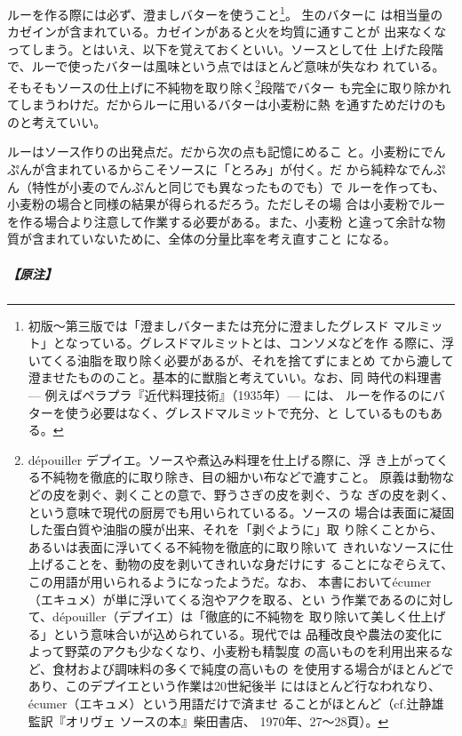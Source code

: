 \begin{recette}
ルーを作る際には必ず、澄ましバターを使うこと\footnote{初版〜第三版では「澄ましバターまたは充分に澄ましたグレスド
  マルミット」となっている。グレスドマルミットとは、コンソメなどを作
  る際に、浮いてくる油脂を取り除く必要があるが、それを捨てずにまとめ
  てから漉して澄ませたもののこと。基本的に獣脂と考えていい。なお、同
  時代の料理書 --- 例えばペラプラ『近代料理技術』（1935年）--- には、
  ルーを作るのにバターを使う必要はなく、グレスドマルミットで充分、と
  しているものもある。}。 生のバターに
は相当量のカゼインが含まれている。カゼインがあると火を均質に通すことが
出来なくなってしまう。とはいえ、以下を覚えておくといい。ソースとして仕
上げた段階で、ルーで使ったバターは風味という点ではほとんど意味が失なわ
れている。そもそもソースの仕上げに不純物を取り除く\footnote{dépouiller
  デプイエ。ソースや煮込み料理を仕上げる際に、浮
  き上がってくる不純物を徹底的に取り除き、目の細かい布などで漉すこと。
  原義は動物などの皮を剥ぐ、剥くことの意で、野うさぎの皮を剥ぐ、うな
  ぎの皮を剥く、という意味で現代の厨房でも用いられているる。ソースの
  場合は表面に凝固した蛋白質や油脂の膜が出来、それを「剥ぐように」取
  り除くことから、あるいは表面に浮いてくる不純物を徹底的に取り除いて
  きれいなソースに仕上げることを、動物の皮を剥いてきれいな身だけにす
  ることになぞらえて、この用語が用いられるようになったようだ。なお、
  本書においてécumer（エキュメ）が単に浮いてくる泡やアクを取る、とい
  う作業であるのに対して、dépouiller（デプイエ）は「徹底的に不純物を
  取り除いて美しく仕上げる」という意味合いが込められている。現代では
  品種改良や農法の変化によって野菜のアクも少なくなり、小麦粉も精製度
  の高いものを利用出来るなど、食材および調味料の多くで純度の高いもの
  を使用する場合がほとんどであり、このデプイエという作業は20世紀後半
  にはほとんど行なわれなり、écumer（エキュメ）という用語だけで済ませ
  ることがほとんど（cf.辻静雄監訳『オリヴェ ソースの本』柴田書店、
  1970年、27〜28頁）。}段階でバター
も完全に取り除かれてしまうわけだ。だからルーに用いるバターは小麦粉に熱
を通すためだけのものと考えていい。

ルーはソース作りの出発点だ。だから次の点も記憶にめるこ
と。小麦粉にでんぷんが含まれているからこそソースに「とろみ」が付く。だ
から純粋なでんぷん（特性が小麦のでんぷんと同じでも異なったものでも）で
ルーを作っても、小麦粉の場合と同様の結果が得られるだろう。ただしその場
合は小麦粉でルーを作る場合より注意して作業する必要がある。また、小麦粉
と違って余計な物質が含まれていないために、全体の分量比率を考え直すこと
になる。

\hypertarget{nota-roux}{%
\subparagraph{【原注】}\label{nota-roux}}


\end{recette}

